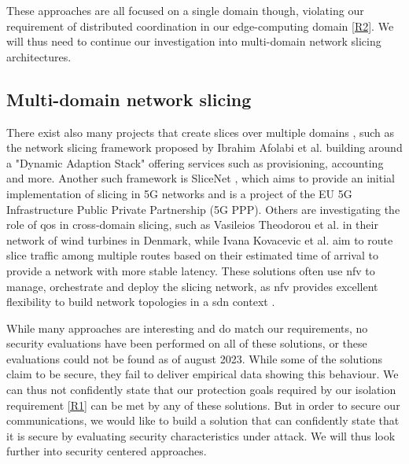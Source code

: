 These approaches are all focused on a single domain though, violating our requirement of distributed coordination in our edge-computing domain \ref{R2}. We will thus need to continue our investigation into multi-domain network slicing architectures.

\subsection{Multi-domain network slicing} There exist also many projects that create slices over multiple domains \cite{MD1,MD2,MD3,MD4,MD5}, such as the network slicing framework proposed by Ibrahim Afolabi et al. \cite{MD1} building around a "Dynamic Adaption Stack" offering services such as provisioning, accounting and more. Another such framework is SliceNet \cite{MD3}, which aims to provide an initial implementation of slicing in 5G networks and is a project of the EU 5G Infrastructure Public Private Partnership (5G PPP). Others are investigating the role of \acrshort{qos} in cross-domain slicing, such as Vasileios Theodorou et al. \cite{MD4} in their network of wind turbines in Denmark, while Ivana Kovacevic et al. \cite{MD5} aim to route slice traffic among multiple routes based on their estimated time of arrival to provide a network with more stable latency. These solutions often use \acrshort{nfv} to manage, orchestrate and deploy the slicing network, as \acrshort{nfv} provides excellent flexibility to build network topologies in a \acrshort{sdn} context \cite{5GSDN1,5GSDN2}.

While many approaches are interesting and do match our requirements, no security evaluations have been performed on all of these solutions, or these evaluations could not be found as of august 2023. While some of the solutions claim to be secure, they fail to deliver empirical data showing this behaviour. We can thus not confidently state that our protection goals required by our isolation requirement \ref{R1} can be met by any of these solutions. But in order to secure our communications, we would like to build a solution that can confidently state that it is secure by evaluating security characteristics under attack. We will thus look further into security centered approaches.

